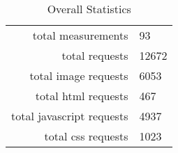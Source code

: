 \begin{table}[h]
\caption{Overall Statistics}\centering
\begin{tabular}{rl}
total measurements & 93\\
total requests & 12672\\
total image requests & 6053\\
total html requests & 467\\
total javascript requests & 4937\\
total css requests & 1023\\
\end{tabular}
\end{table}
